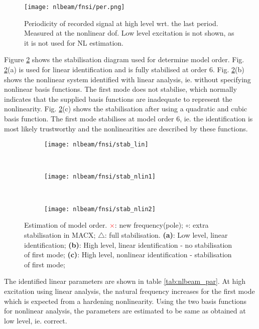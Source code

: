 \begin{figure}[!ht]
  \centering
  \texttt{[image: nlbeam/fnsi/per.png]}
  \caption{Periodicity of recorded signal at high level wrt. the last period.
    Measured at the nonlinear dof. Low level excitation is not shown, as it is
    not used for NL estimation.}
  \label{fig:nlbeam_per}
\end{figure}

Figure \ref{fig:nlbeam_stab} shows the stabilisation diagram used for determine
model order. Fig. \ref{fig:nlbeam_stab}(a) is used for linear identification and
is fully stabilised at order 6. Fig. \ref{fig:nlbeam_stab}(b) shows the
nonlinear system identified with linear analysis, ie. without specifying
nonlinear basis functions. The first mode does not stabilise, which normally
indicates that the supplied basis functions are inadequate to represent the
nonlinearity. Fig. \ref{fig:nlbeam_stab}(c) shows the stabilisation after
using a quadratic and cubic basis function. The first mode stabilises at
model order 6, ie. the identification is most likely trustworthy and the
nonlinearities are described by these functions.

\begin{figure}
  \centering
  \begin{subfigure}[b]{0.45\textwidth}
    \texttt{[image: nlbeam/fnsi/stab\_lin]}
    \caption{}
  \end{subfigure}
  ~
  \begin{subfigure}[b]{0.45\textwidth}
    \texttt{[image: nlbeam/fnsi/stab\_nlin1]}
    \caption{}
  \end{subfigure}
  \\
  \begin{subfigure}[b]{0.45\textwidth}
    \texttt{[image: nlbeam/fnsi/stab\_nlin2]}
    \caption{}
  \end{subfigure}
  \caption{Estimation of model order.
    \textcolor{red}{$\pmb\times$}: new frequency(pole);
    $\pmb\circ$: extra stabilisation in MACX;
    $\pmb\triangle$: full stabilisation.
    \textbf{(a)}: Low level, linear identification;
    \textbf{(b)}: High level, linear identification - no stabilisation of first mode;
    \textbf{(c)}: High level, nonlinear identification - stabilisation of first mode;
  }
  \label{fig:nlbeam_stab}
\end{figure}

The identified linear parameters are shown in table \ref{tab:nlbeam_par}. At
high excitation using linear analysis, the natural frequency increases for the
first mode which is expected from a hardening nonlinearity.
Using the two basis functions for nonlinear analysis, the parameters are
estimated to be same as obtained at low level, ie. correct.

